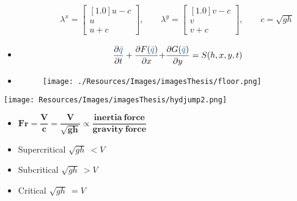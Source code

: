 \begin{frame}
\begin{minipage}{0.35\textwidth}
\begin{itemize}
\begin{align*}
&\qquad \lambda^x = 
\begin{bmatrix}[1.0]
u - c\\
u\\
u+c
\end{bmatrix}
,\qquad  \lambda^y = 
\begin{bmatrix}[1.0]
v - c\\
v\\
v+c
\end{bmatrix}
,\qquad c = \sqrt{gh}
\end{align*}
\item<1->[]
\begin{align*}
\qquad \qquad \frac{\partial \myTUMdarkblue{\bar{q}}}{\partial t} + \dfrac{\partial F(\myTUMdarkblue{\bar{q}})}{\partial x} + &\frac{\partial G(\myTUMdarkblue{\bar{q}})}{\partial y} = S(h,x,y,t)
\end{align*}
\end{itemize}
\end{minipage}
\begin{minipage}{0.45\textwidth}  
\begin{itemize}[leftmargin=*]
\item<1->[]
\vspace{2cm}
\begin{center}
\begin{figure}
\texttt{[image: ./Resources/Images/imagesThesis/floor.png]}
\label{fig:swechemedit}
\end{figure}
\end{center}
\end{itemize}
\end{minipage}

\end{frame}
\clearpage


\begin{frame}
\begin{minipage}{0.5\textwidth}
\vspace{1cm}
\texttt{[image: Resources/Images/imagesThesis/hydjump2.png]}
\end{minipage}
\hspace{1cm}
\begin{minipage}{0.4\textwidth}
\vspace{1.5cm}
\begin{tcolorbox}[colback=white] 
\begin{itemize}
\setlength{\itemsep}{1cm}
\item[] $\mathbf{Fr = \dfrac{V}{c} =\dfrac{V}{\sqrt{gh}} \propto \dfrac{inertia\ force}{gravity\ force}}$
\item Supercritical $\sqrt{gh}\ < V$
\item Subcritical $\sqrt{gh}\ > V$
\item Critical $\sqrt{gh}\  =  V$
\end{itemize}
\end{tcolorbox}
\end{minipage}
\end{frame}
